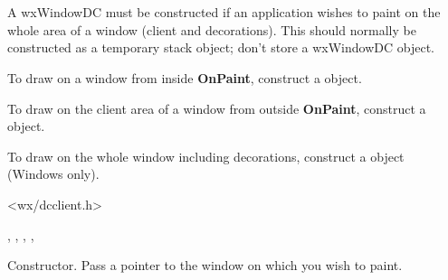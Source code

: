 \section{}\label{wxwindowdc}

A wxWindowDC must be constructed if an application wishes to paint on the
whole area of a window (client and decorations).
This should normally be constructed as a temporary stack object; don't store
a wxWindowDC object.

To draw on a window from inside {\bf OnPaint}, construct a  object.

To draw on the client area of a window from outside {\bf OnPaint}, construct a  object.

To draw on the whole window including decorations, construct a  object
(Windows only).




<wx/dcclient.h>


, , ,\rtfsp
{}, 


\label{wxwindowdcwxwindowdc}


Constructor. Pass a pointer to the window on which you wish to paint.



